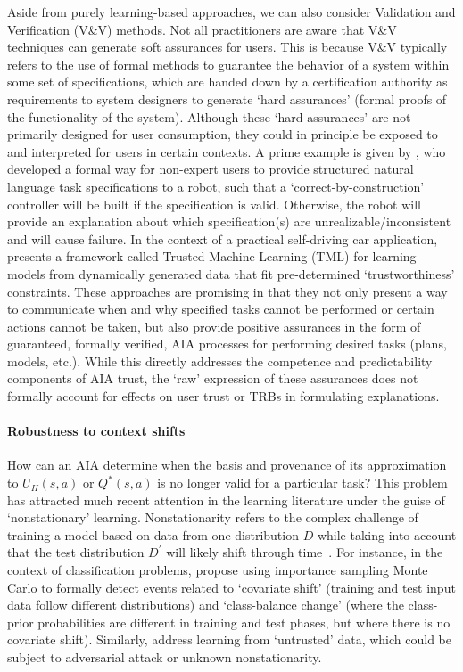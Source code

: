 Aside from purely learning-based approaches, we can also consider Validation and Verification (V\&V) methods. 
Not all practitioners are aware that V\&V techniques can generate soft assurances for users. 
This is because V\&V typically refers to the use of formal methods to guarantee the behavior of a system within some set of specifications, which are handed down by a certification authority as requirements to system designers to generate `hard assurances' (formal proofs of the functionality of the system). 
Although these `hard assurances' are not primarily designed for user consumption, they could in principle be exposed to and interpreted for users in certain contexts. 
A prime example is given by \citet{Raman2013-mz}, who developed a formal way for non-expert users to provide structured natural language task specifications to a robot, such that a `correct-by-construction' controller will be built if the specification is valid. 
Otherwise, the robot will provide an explanation about which specification(s) are unrealizable/inconsistent and will cause failure. 
In the context of a practical self-driving car application, \citet{Ghosh2016-dl} presents a framework called Trusted Machine Learning (TML) for learning models from dynamically generated data that fit pre-determined `trustworthiness' constraints. 
These approaches are promising in that they not only present a way to communicate when and why specified tasks cannot be performed or certain actions cannot be taken, but also provide positive assurances in the form of guaranteed, formally verified, AIA processes for performing desired tasks (plans, models, etc.). 
While this directly addresses the competence and predictability components of AIA trust, the `raw' expression of these assurances does not formally account for effects on user trust or TRBs in formulating explanations. 

\paragraph{Robustness to context shifts}
How can an AIA determine when the basis and provenance of its approximation to $U_H(s,a)$ or $Q^*(s,a)$ is no longer valid for a particular task? 
This problem has attracted much recent attention in the learning literature under the guise of `nonstationary' learning. 
Nonstationarity refers to the complex challenge of training a model based on data from one distribution $D$ while taking into account that the test distribution $D^\prime$ will likely shift through time~\cite{Quinonero-Candela2009-fj}. 
For instance, in the context of classification problems, \citet{Sugiyama2013-ci} propose using importance sampling Monte Carlo to formally detect events related to `covariate shift' (training and test input data follow different distributions) and `class-balance change' (where the class-prior probabilities are different in training and test phases, but where there is no covariate shift). 
Similarly, \citet{Charikar2017-kr} address learning from `untrusted' data, which could be subject to adversarial attack or unknown nonstationarity. 

